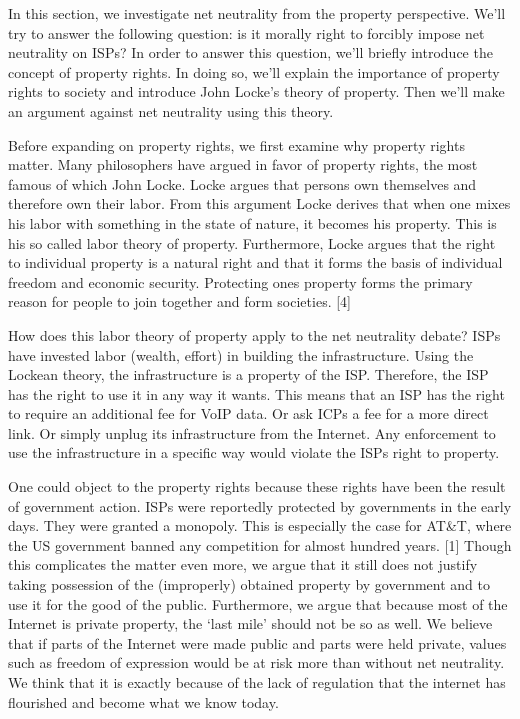 
In this section, we investigate net neutrality from the property perspective. We'll try to answer the following question: is it morally right to forcibly impose net neutrality on \acp{ISP}? In order to answer this question, we'll briefly introduce the concept of property rights. In doing so, we'll explain the importance of property rights to society and introduce John Locke's theory of property. Then we'll make an argument against net neutrality using this theory.

Before expanding on property rights, we first examine why property rights matter. Many philosophers have argued in favor of property rights, the most famous of which John Locke. Locke argues that persons own themselves and therefore own their labor. From this argument Locke derives that when one mixes his labor with something in the state of nature, it becomes his property. This is his so called labor theory of property. Furthermore, Locke argues that the right to individual property is a natural right and that it forms the basis of individual freedom and economic security. Protecting ones property forms the primary reason for people to join together and form societies. [4]

How does this labor theory of property apply to the net neutrality debate? \acp{ISP} have invested labor (wealth, effort) in building the infrastructure. Using the Lockean theory, the infrastructure is a property of the \ac{ISP}. Therefore, the \ac{ISP} has the right to use it in any way it wants. This means that an \ac{ISP} has the right to require an additional fee for \ac{VoIP} data. Or ask ICPs a fee for a more direct link. Or simply unplug its infrastructure from the Internet. Any enforcement to use the infrastructure in a specific way would violate the \acp{ISP} right to property.

One could object to the property rights because these rights have been the result of government action. \acp{ISP} were reportedly protected by governments in the early days. They were granted a monopoly. This is especially the case for AT\&T, where the US government banned any competition for almost hundred years. [1] Though this complicates the matter even more, we argue that it still does not justify taking possession of the (improperly) obtained property by government and to use it for the good of the public. Furthermore, we argue that because most of the Internet is private property, the `last mile' should not be so as well. We believe that if parts of the Internet were made public and parts were held private, values such as freedom of expression would be at risk more than without net neutrality. We think that it is exactly because of the lack of regulation that the internet has flourished and become what we know today.

